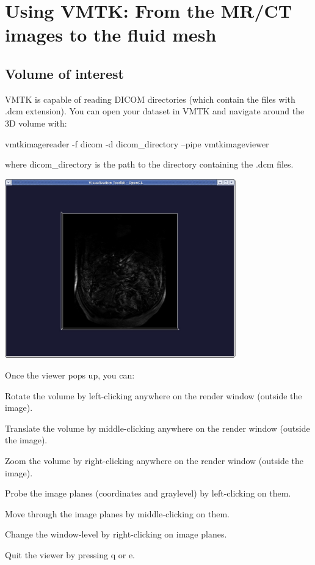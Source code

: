  

\hypertarget{index_vmtk}{}\section{Using V\+M\+T\+K\+: From the M\+R/\+C\+T images to the fluid mesh}\label{index_vmtk}
\hypertarget{index_voi}{}\subsection{Volume of interest}\label{index_voi}
V\+M\+TK is capable of reading D\+I\+C\+OM directories (which contain the files with .dcm extension). You can open your dataset in V\+M\+TK and navigate around the 3D volume with\+: 
\begin{DoxyCode}
vmtkimagereader -f dicom -d dicom\_directory --pipe vmtkimageviewer
\end{DoxyCode}


where {\ttfamily dicom\+\_\+directory} is the path to the directory containing the .dcm files.

 
\begin{DoxyImageNoCaption}
  \mbox{\includegraphics[width=0.75\textwidth]{scan}}
\end{DoxyImageNoCaption}


Once the viewer pops up, you can\+:


\begin{DoxyItemize}
\item Rotate the volume by left-\/clicking anywhere on the render window (outside the image).
\item Translate the volume by middle-\/clicking anywhere on the render window (outside the image).
\item Zoom the volume by right-\/clicking anywhere on the render window (outside the image).
\item Probe the image planes (coordinates and graylevel) by left-\/clicking on them.
\item Move through the image planes by middle-\/clicking on them.
\item Change the window-\/level by right-\/clicking on image planes.
\item Quit the viewer by pressing {\ttfamily q} or {\ttfamily e}.
\end{DoxyItemize}


